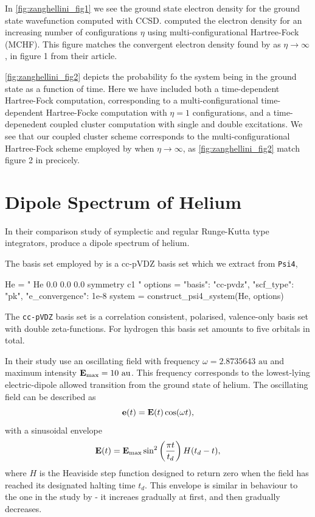 In \autoref{fig:zanghellini_fig1} we see the ground state electron density for the 
ground state wavefunction computed with CCSD. \citeauthor{Zanghellini04} computed the electron
density for an increasing number of configurations $\eta$ using multi-configurational
Hartree-Fock (MCHF). This figure matches the convergent electron density found by
\citeauthor{Zanghellini04} as $\eta \to \infty$, in figure 1 from their article. 

\autoref{fig:zanghellini_fig2} depicts the probability fo the system being in the ground 
state as a function of time. Here we have included both a time-dependent Hartree-Fock
computation, corresponding to a multi-configurational time-dependent 
Hartree-Focke computation with $\eta=1$ configurations, and 
a time-depenedent coupled cluster computation with single and double excitations.
We see that our coupled cluster scheme corresponds to the multi-configurational Hartree-Fock 
scheme employed by \citeauthor{Zanghellini04} when $\eta\to\infty$, as
\autoref{fig:zanghellini_fig2} match figure 2 in
\citeauthor{Zanghellini04}\cite{Zanghellini04} precicely.


\section{Dipole Spectrum of Helium}

In their comparison study of symplectic and regular Runge-Kutta type integrators, 
\citeauthor{pedersen2019symplectic}\cite{pedersen2019symplectic} produce a dipole 
spectrum of helium. 

The basis set employed by \citeauthor{pedersen2019symplectic} is a cc-pVDZ 
basis set which we extract from \lstinline{Psi4},
\begin{python}
He = "
    He 0.0 0.0 0.0
    symmetry c1
"
options = {"basis": "cc-pvdz", "scf_type": "pk", "e_convergence": 1e-8}
system = construct_psi4_system(He, options)
\end{python}
The \lstinline{cc-pVDZ} basis set is a correlation consistent, polarised, valence-only 
basis set with double zeta-functions. For hydrogen this basis set amounts to five 
orbitals in total.

In their study \citeauthor{pedersen2019symplectic} use an oscillating field with 
frequency $\omega=2.8735643 \text{ au}$ and maximum intensity
$\vb{E}_\text{max} = 10 \text{ au}$. This frequency corresponds to the lowest-lying 
electric-dipole allowed transition from the ground state of helium. The oscillating 
field can be described as 
\begin{equation}
    \vb{e}(t) = \vb{E}(t) \cos(\omega t),
\end{equation}
with a sinusoidal envelope
\begin{equation}
    \vb{E}(t) = \vb{E}_\text{max}\sin^2\left(\frac{\pi t}{t_d}\right) H(t_d - t),
\end{equation}
where $H$ is the Heaviside step function designed to return zero when the field 
has reached its designated halting time $t_d$. This envelope is similar in behaviour 
to the one in the study by \citeauthor{li2005time}\cite{li2005time} - it 
increaes gradually at first, and then gradually decreases. 

